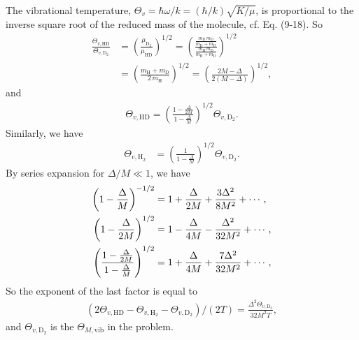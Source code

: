 \documentclass[twocolumn, 10pt]{article}
\numberwithin{equation}{section}
\newenvironment{solution}[1][\empty]
{\par\medskip\sffamily
  \textbf{\ifx\empty#1{Solution.}\relax\else{#1}\fi} \ignorespaces}
{\medskip}
\begin{document}
\begin{solution}
  The vibrational temperature,
  $\Theta_v = \hbar \omega/k = (\hbar/k) \sqrt{K/\mu}$,
  is proportional to the inverse square root
  of the reduced mass of the molecule, cf. Eq. (9-18).
  So
  \begin{align*}
    \frac{ \Theta_{v, \mathrm{HD}  } }
         { \Theta_{v, \mathrm{D}_2 } }
    &=
    \left(
    \frac{ \mu_{\mathrm{D}_2} }
    { \mu_\mathrm{HD} }
    \right)^{1/2}
    =
    \left(
    \frac{
      \frac{ m_\mathrm{D} \, m_\mathrm{D} }
      { m_\mathrm{D} + m_\mathrm{D} }
    }
    {
      \frac{ m_\mathrm{H} \, m_\mathrm{D} }
           { m_\mathrm{H} + m_\mathrm{D} }
    }
    \right)^{1/2}
    \\
    &=
    \left(
    \frac{
      m_\mathrm{H} + m_\mathrm{D}
    }
    {
      2 \, m_\mathrm{H}
    }
    \right)^{1/2}
    =
    \left(
    \frac{ 2 M - \Delta }
         { 2 (M - \Delta) }
    \right)^{1/2}
    ,
  \end{align*}
  and
  \begin{align}
    \Theta_{v, \mathrm{HD}}
    =
    \left(
    \frac{ 1 - \frac{\Delta}{2M} }
         { 1 - \frac{\Delta}{M} }
    \right)^{1/2}
    \Theta_{v, \mathrm{D}_2}
    .
    \label{eq:Theta_v_HD}
  \end{align}
  Similarly, we have
  \begin{align}
    \Theta_{v, \mathrm{H}_2}
    &=
    \left(
    \frac{ 1 }
         { 1-\frac{\Delta}{M} }
    \right)^{1/2}
    \Theta_{v, \mathrm{D}_2}
    .
    \label{eq:Theta_v_H2}
  \end{align}
  By series expansion for $\Delta/M \ll 1$,
  we have
  \begin{align}
    \left( 1 - \frac{\Delta}{M} \right)^{-1/2}
    &=
    1 + \frac{\Delta}{2M} + \frac{3\Delta^2}{8M^2} + \cdots,
    \label{eq:prob9-6_ex1}
    \\
    \left( 1 - \frac{\Delta}{2M} \right)^{1/2}
    &=
    1 - \frac{\Delta}{4M} - \frac{\Delta^2}{32M^2} + \cdots,
    \notag \\
    \left(
    \frac{ 1 - \frac{\Delta}{2M} }
         { 1 - \frac{\Delta}{M} }
    \right)^{1/2}
    &=
    1 + \frac{\Delta}{4M} + \frac{7\Delta^2}{32M^2} + \cdots
    ,
    \label{eq:prob9-6_ex3}
  \end{align}
  So the exponent of the last factor is equal to
  \begin{align*}
    \left(
    2\Theta_{v, \mathrm{HD}}
    -\Theta_{v, \mathrm{H}_2}
    -\Theta_{v, \mathrm{D}_2}
    \right)/(2T)
    =
    \frac{\Delta^2
    \Theta_{v, \mathrm{D}_2 }
    }{32M^2 T}
    ,
  \end{align*}
  and $\Theta_{v, \mathrm{D}_2}$
  is the $\Theta_{M, \mathrm{vib}}$
  in the problem.


\end{solution}
\end{document}
